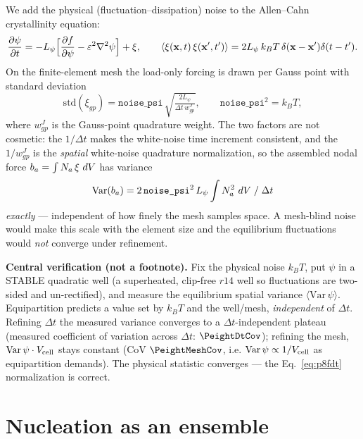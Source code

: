 We add the physical (fluctuation--dissipation) noise to the Allen--Cahn
crystallinity equation:
%
\begin{equation}
  \frac{\partial \psi}{\partial t} = -L_\psi\Big[\frac{\partial f}{\partial \psi}-\varepsilon^2\nabla^2\psi\Big]
   + \xi,\qquad
  \langle\xi(\mathbf{x},t)\,\xi(\mathbf{x}',t')\rangle
   = 2L_\psi\,k_BT\,\delta(\mathbf{x}-\mathbf{x}')\delta(t-t').
\end{equation}
%
On the finite-element mesh the load-only forcing is drawn per Gauss point
with standard deviation
%
\begin{equation}
  \mathrm{std}(\xi_{gp}) = \texttt{noise\_psi}\,
     \sqrt{\tfrac{2 L_\psi}{\Delta t\,w^J_{gp}}},
     \qquad \texttt{noise\_psi}^2 = k_BT,
  \label{eq:p8fdt}
\end{equation}
%
where $w^J_{gp}$ is the Gauss-point quadrature weight. The two factors are
not cosmetic: the $1/\Delta t$ makes the white-noise time increment
consistent, and the $1/w^J_{gp}$ is the \emph{spatial} white-noise
quadrature normalization, so the assembled nodal force
$b_a=\int N_a\,\xi\,\,dV$ has variance
%
\begin{equation}
  \mathrm{Var}(b_a) = 2\,\texttt{noise\_psi}^2\,L_\psi
     \int N_a^2\,\,dV \;/\;\Delta t
\end{equation}
%
\emph{exactly} --- independent of how finely the mesh samples space. A
mesh-blind noise would make this scale with the element size and the
equilibrium fluctuations would \emph{not} converge under refinement.

\begin{keybox}
\textbf{Central verification (not a footnote).} Fix the physical noise
$k_BT$, put $\psi$ in a STABLE quadratic well (a superheated, clip-free
$r14$ well so fluctuations are two-sided and un-rectified), and measure
the equilibrium spatial variance $\langle\mathrm{Var}\,\psi\rangle$.
Equipartition predicts a value set by $k_BT$ and the well/mesh,
\emph{independent} of $\Delta t$. Refining $\Delta t$ the measured variance
converges to a $\Delta t$-independent plateau (measured coefficient of
variation across $\Delta t$: $\ensuremath{\PeightDtCov}$); refining the
mesh, $\mathrm{Var}\,\psi\cdot V_{\rm cell}$ stays constant (CoV
$\ensuremath{\PeightMeshCov}$, i.e. $\mathrm{Var}\,\psi\propto1/V_{\rm cell}$
as equipartition demands). The physical statistic converges --- the
Eq.~\eqref{eq:p8fdt} normalization is correct.
\end{keybox}

\section{Nucleation as an ensemble}

